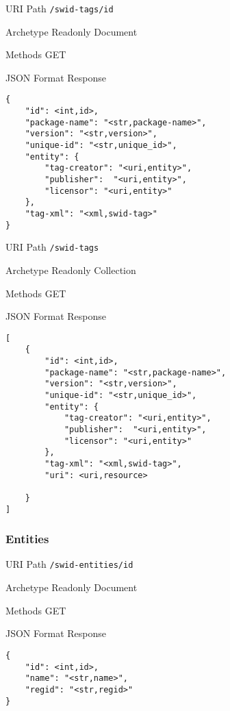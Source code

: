 \documentclass[10pt,a4paper]{scrartcl}
\begin{document}
\begin{mdframed}[style=def]
\begin{description*}
	\item[URI Path] \texttt{/swid-tags/{id}}
	\item[Archetype] Readonly Document
	\item[Methods] GET
	\item[JSON Format Response] \hfill
\begin{lstlisting}
{
	"id": <int,id>,
	"package-name": "<str,package-name>",
	"version": "<str,version>",
	"unique-id": "<str,unique_id>",
	"entity": {
		"tag-creator": "<uri,entity>",
		"publisher":  "<uri,entity>",
		"licensor": "<uri,entity>"
	},
	"tag-xml": "<xml,swid-tag>"
}
\end{lstlisting}
\end{description*}
\end{mdframed}

\begin{mdframed}[style=def]
\begin{description*}
	\item[URI Path] \texttt{/swid-tags}
	\item[Archetype] Readonly Collection
	\item[Methods] GET
	\item[JSON Format Response] \hfill
\begin{lstlisting}
[
	{
		"id": <int,id>,
    	"package-name": "<str,package-name>",
    	"version": "<str,version>",
    	"unique-id": "<str,unique_id>",
    	"entity": {
    		"tag-creator": "<uri,entity>",
    		"publisher":  "<uri,entity>",
    		"licensor": "<uri,entity>"
    	},
    	"tag-xml": "<xml,swid-tag>",
    	"uri": <uri,resource>
    	
	}
]
\end{lstlisting}
\end{description*}
\end{mdframed}


\pagebreak
\subsubsection{Entities}

\begin{mdframed}[style=def]
\begin{description*}
	\item[URI Path] \texttt{/swid-entities/{id}}
	\item[Archetype] Readonly Document
	\item[Methods] GET
	\item[JSON Format Response] \hfill
\begin{lstlisting}
{
	"id": <int,id>,
	"name": "<str,name>",
	"regid": "<str,regid>"
}
\end{lstlisting}
\end{description*}
\end{mdframed}
\end{document}
